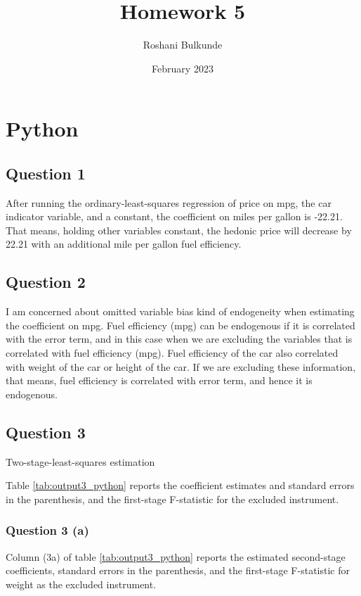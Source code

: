 \documentclass{article}
\title{Homework 5}
\author{Roshani Bulkunde}
\date{February 2023}
\begin{document}
\maketitle

\section{Python}

\subsection{Question 1}
After running the ordinary-least-squares regression of price on mpg, the car indicator variable, and a constant, the coefficient on miles per gallon is -22.21. That means, holding other variables constant, the hedonic price will decrease by 22.21 with an additional mile per gallon fuel efficiency.
 

\subsection{Question 2}
I am concerned about omitted variable bias kind of endogeneity when estimating the coefficient on mpg. Fuel efficiency (mpg) can be endogenous if it is correlated with the error term, and in this case when we are excluding the variables that is correlated with fuel efficiency (mpg). Fuel efficiency of the car also correlated with weight of the car or height of the car. If we are excluding these information, that means, fuel efficiency is correlated with error term, and hence it is endogenous.


\subsection{Question 3 }
\begin{table}[ht]
    \centering
    
    \caption{Two-stage-least-squares estimation}
    \label{tab:output3_python}
\end{table}



Table \ref{tab:output3_python} reports the coefficient estimates and standard errors in the parenthesis, and the first-stage F-statistic for the excluded instrument. 

\subsubsection{Question 3 (a)}
Column (3a) of table \ref{tab:output3_python} reports the estimated second-stage coefficients, standard errors in the parenthesis, and the first-stage F-statistic for weight as the excluded instrument.
\end{document}
